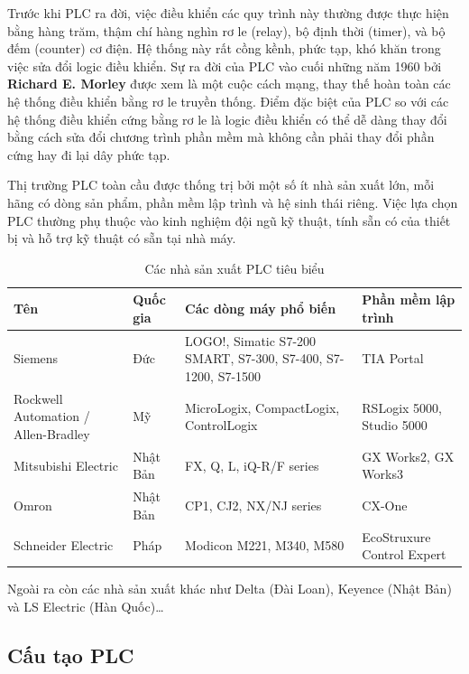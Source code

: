 \documentclass[../main.tex]{subfiles}
\begin{document}
Trước khi PLC ra đời, việc điều khiển các quy trình này thường được thực hiện bằng hàng trăm, thậm chí hàng nghìn rơ le (relay), bộ định thời (timer), và bộ đếm (counter) cơ điện. Hệ thống này rất cồng kềnh, phức tạp, khó khăn trong việc sửa đổi logic điều khiển. Sự ra đời của PLC vào cuối những năm 1960 bởi \textbf{Richard E. Morley} được xem là một cuộc cách mạng, thay thế hoàn toàn các hệ thống điều khiển bằng rơ le truyền thống. Điểm đặc biệt của PLC so với các hệ thống điều khiển cứng bằng rơ le là logic điều khiển có thể dễ dàng thay đổi bằng cách sửa đổi chương trình phần mềm mà không cần phải thay đổi phần cứng hay đi lại dây phức tạp.

Thị trường PLC toàn cầu được thống trị bởi một số ít nhà sản xuất lớn, mỗi hãng có dòng sản phẩm, 
phần mềm lập trình và hệ sinh thái riêng. Việc lựa chọn PLC thường phụ thuộc vào kinh nghiệm đội 
ngũ kỹ thuật, tính sẵn có của thiết bị và hỗ trợ kỹ thuật có sẵn tại nhà máy.

\begin{table}[H]
    \centering
    \caption{Các nhà sản xuất PLC tiêu biểu}
    \label{tab:plc-manufacturers}
    \begin{tabular}{|p{3.2cm}|p{1.8cm}|p{4.2cm}|p{3.5cm}|}
        \hline
        \textbf{Tên} & \textbf{Quốc gia} & \textbf{Các dòng máy phổ biến} & \textbf{Phần mềm lập trình} \\
        \hline
        Siemens & Đức & LOGO!, Simatic S7-200 SMART, S7-300, S7-400, S7-1200, S7-1500 & TIA Portal \\
        \hline
        Rockwell Automation / Allen-Bradley & Mỹ & MicroLogix, CompactLogix, ControlLogix & RSLogix 5000, Studio 5000 \\
        \hline
        Mitsubishi Electric & Nhật Bản & FX, Q, L, iQ-R/F series & GX Works2, GX Works3 \\
        \hline
        Omron & Nhật Bản & CP1, CJ2, NX/NJ series & CX-One \\
        \hline
        Schneider Electric & Pháp & Modicon M221, M340, M580 & EcoStruxure Control Expert \\
        \hline
    \end{tabular}
\end{table}

Ngoài ra còn các nhà sản xuất khác như Delta (Đài Loan), Keyence (Nhật Bản) và LS Electric (Hàn Quốc)\ldots

\subsection{Cấu tạo PLC}
\end{document}
